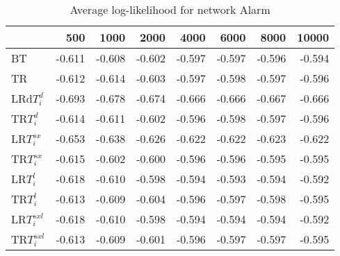 
\begin{table}
 \begin{center}
 \begin{tabular}{lrrrrrrr}
& 500 &  1000 & 2000 & 4000 & 6000& 8000&  10000\\\hline
BT & -0.611 & -0.608 & -0.602 & -0.597 & -0.597 & -0.596 & -0.594\\\hline
TR & -0.612 & -0.614 & -0.603 & -0.597 & -0.598 & -0.597 & -0.596\\\hline
LRd$T_i^d$ & -0.693 & -0.678 & -0.674 & -0.666 & -0.666 & -0.667 & -0.666\\\hline
TR$T_i^d$ & -0.614 & -0.611 & -0.602 & -0.596 & -0.598 & -0.597 & -0.596\\\hline
LR$T_i^{sx}$ & -0.653 & -0.638 & -0.626 & -0.622 & -0.622 & -0.623 & -0.622\\\hline
TR$T_i^{sx}$ & -0.615 & -0.602 & -0.600 & -0.596 & -0.596 & -0.595 & -0.595\\\hline
LR$T_i^l$ & -0.618 & -0.610 & -0.598 & -0.594 & -0.593 & -0.594 & -0.592\\\hline
TR$T_i^l$ & -0.613 & -0.609 & -0.604 & -0.596 & -0.597 & -0.598 & -0.595\\\hline
LR$T_i^{sxl}$ & -0.618 & -0.610 & -0.598 & -0.594 & -0.594 & -0.594 & -0.592\\\hline
TR$T_i^{sxl}$ & -0.613 & -0.609 & -0.601 & -0.596 & -0.597 & -0.597 & -0.595\\\hline
\end{tabular}
\end{center}
\caption{Average log-likelihood for network Alarm }
\label{Alarmll}
\end{table}


